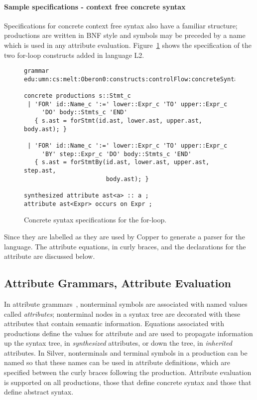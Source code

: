 \paragraph{Sample specifications - context free concrete syntax}
Specifications for concrete context free syntax also have a familiar
structure; productions are written in BNF style and symbols may be
preceded by a name which is used in any attribute evaluation.
Figure~\ref{silver:fig:concrete} shows the specification
of the two for-loop constructs added in language L2.
\begin{figure}
%
{\small
\begin{verbatim}
grammar edu:umn:cs:melt:Oberon0:constructs:controlFlow:concreteSyntax;

concrete productions s::Stmt_c
 | 'FOR' id::Name_c ':=' lower::Expr_c 'TO' upper::Expr_c
     'DO' body::Stmts_c 'END'         
   { s.ast = forStmt(id.ast, lower.ast, upper.ast, body.ast); }

 | 'FOR' id::Name_c ':=' lower::Expr_c 'TO' upper::Expr_c
     'BY' step::Expr_c 'DO' body::Stmts_c 'END' 
   { s.ast = forStmtBy(id.ast, lower.ast, upper.ast, step.ast, 
                       body.ast); }

synthesized attribute ast<a> :: a ;
attribute ast<Expr> occurs on Expr ;
\end{verbatim}
}
\caption{Concrete syntax specifications for the for-loop.}
\label{silver:fig:concrete}
\end{figure}
Since they are labelled as  they are used by
Copper to generate a parser for the language.  The attribute
equations, in curly braces, and the declarations for the attribute
 are discussed below.


\subsection{Attribute Grammars, Attribute Evaluation}

In attribute grammars~\cite{knuth68}, nonterminal symbols are
associated with named values called \emph{attributes}; nonterminal
nodes in a syntax tree are decorated with these attributes that
contain semantic information.
%
Equations associated with productions define the values for attribute
and are used to propagate information up the syntax tree, in
\emph{synthesized} attributes, or down the tree, in \emph{inherited}
attributes.
%
In Silver, nonterminals and terminal symbols in a production can be
named so that these names can be used in attribute definitions, which
are specified between the curly braces following the production.
Attribute evaluation is supported on all productions, those that
define concrete syntax and those that define abstract syntax.

